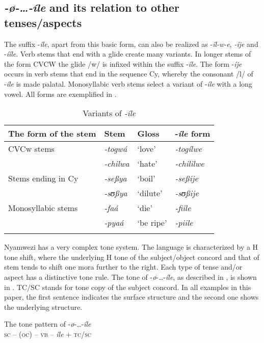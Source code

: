 \documentclass[output=paper,newtxmath,modfonts,nonflat,draftmode]{langsci/langscibook}
\begin{document}
\subsection{\textit{-ø-…-íle} and its relation to other tenses/aspects}

The suffix -\textit{íle}, apart from this basic form, can also be realized as -\textit{íl-w-e}, \textit{-íje} and -\textit{ííle}. Verb stems that end with a glide create many variants. In longer stems of the form CVCW the glide /w/ is infixed within the suffix -\textit{íle}. The form -\textit{íje} occurs in verb stems that end in the sequence Cy, whereby the consonant /l/ of -\textit{íle} is made palatal. Monosyllabic verb stems select a variant of -\textit{íle} with a long vowel. All forms are exemplified in . 

\begin{table}
\caption{Variants of \textit{-íle}}
\label{tab:kanijo:1}
\begin{tabularx}{\textwidth}{lXXX}
\lsptoprule
 The form of the stem &  Stem &  Gloss &  -\textit{íle} form\\
\midrule
CVCw stems & \textit{-togwá} & ‘love’ & \textit{-togílwe}\\
& \textit{-chilwa} & ‘hate’ & \textit{-chililwe}\\
\tablevspace
Stems ending in Cy & \textit{-seßya} & ‘boil’ & \textit{-seßije}\\
 & \textit{-sʊßya} & ‘dilute’ & \textit{-sʊßije}\\

\tablevspace
Monosyllabic stems & \textit{-faá} & ‘die’ & \textit{-fiile}\\
 & \textit{-pyaá} & ‘be ripe’ & \textit{-piile}\\
\lspbottomrule
\end{tabularx}
\end{table}


Nyamwezi has a very complex tone system. The language is characterized by a H tone shift, where the underlying H tone of the subject/object concord and that of stem tends to shift one mora further to the right. Each type of tense and/or aspect has a distinctive tone rule. The tone of -\textit{ø}-…-\textit{íle}, as described in \citet[126]{Maganga1992}, is shown in . \textsc{TC/SC} stands for tone copy of the subject concord. In all examples in this paper, the first sentence indicates the surface structure and the second one shows the underlying structure. 

\ea \label{ex:kanijo:2}
The tone pattern of -\textit{ø}-…-\textit{íle}\\
\textsc{sc} – (\textsc{oc}) – \textsc{vb} – \textit{íle} + \textsc{tc}/\textsc{sc}\\
\z
\end{document}
